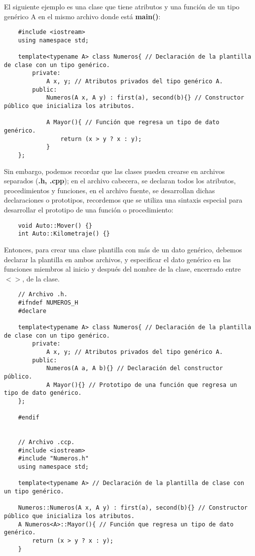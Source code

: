 El siguiente ejemplo es una clase que tiene atributos y una función de un tipo genérico A en el mismo archivo donde está \textbf{main()}:
\begin{lstlisting}
    #include <iostream>
    using namespace std;
    
    template<typename A> class Numeros{ // Declaración de la plantilla de clase con un tipo genérico.
        private:
            A x, y; // Atributos privados del tipo genérico A.
        public:
            Numeros(A x, A y) : first(a), second(b){} // Constructor público que inicializa los atributos.
            
            A Mayor(){ // Función que regresa un tipo de dato genérico.
                return (x > y ? x : y);
            }
    };
\end{lstlisting}

Sin embargo, podemos recordar que las clases pueden crearse en archivos separados (\textbf{.h, .cpp}); en el archivo cabecera, se declaran todos los atributos, procedimientos y funciones, en el archivo fuente, se desarrollan dichas declaraciones o prototipos, recordemos que se utiliza una sintaxis especial para desarrollar el prototipo de una función o procedimiento:
\begin{lstlisting}
    void Auto::Mover() {}
    int Auto::Kilometraje() {}
\end{lstlisting}

Entonces, para crear una clase plantilla con más de un dato genérico, debemos declarar la plantilla en ambos archivos, y especificar el dato genérico en las funciones miembros al inicio y después del nombre de la clase, encerrado entre \textbf{$< >$}, de la clase. 
\begin{lstlisting}
    // Archivo .h.
    #ifndef NUMEROS_H
    #declare
    
    template<typename A> class Numeros{ // Declaración de la plantilla de clase con un tipo genérico.
        private:
            A x, y; // Atributos privados del tipo genérico A.
        public:
            Numeros(A a, A b){} // Declaración del constructor público.
            A Mayor(){} // Prototipo de una función que regresa un tipo de dato genérico.
    };
    
    #endif

    
    // Archivo .ccp.
    #include <iostream>
    #include "Numeros.h"
    using namespace std;
    
    template<typename A> // Declaración de la plantilla de clase con un tipo genérico.
    
    Numeros::Numeros(A x, A y) : first(a), second(b){} // Constructor público que inicializa los atributos.
    A Numeros<A>::Mayor(){ // Función que regresa un tipo de dato genérico.
        return (x > y ? x : y);
    }
\end{lstlisting}

